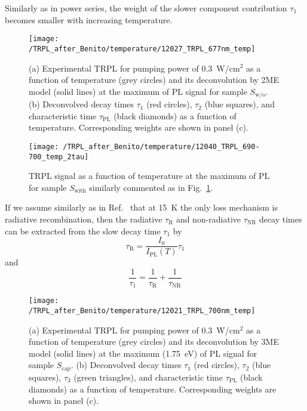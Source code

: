 {{Similarly as in power series, the weight of the slower component contribution $\tau_1$ becomes smaller with increasing temperature.
%
\begin{figure}
	\centering
	\texttt{[image: /TRPL\_after\_Benito/temperature/12027\_TRPL\_677nm\_temp]}
	\caption{(a) Experimental TRPL for pumping power of 0.3~W/cm$^2$ as a function of temperature (grey circles) and its deconvolution by 2ME model (solid lines) at the maximum of PL signal for sample $S_\mathrm{w/o}$. (b) Deconvolved decay times $\tau_1$ (red circles), $\tau_2$ (blue squares), and characteristic time $\tau_\mathrm{PL}$ (black diamonds) as a function of temperature. Corresponding weights are shown in panel (c).}
	\label{fig:TRPL_temp_wo}
\end{figure}
%
\begin{figure}
	\centering
	\texttt{[image: /TRPL\_after\_Benito/temperature/12040\_TRPL\_690-700\_temp\_2tau]}
	\caption{TRPL signal as a function of temperature at the maximum of PL for sample $S_\mathrm{with}$ similarly commented as in Fig.~\ref{fig:TRPL_temp_wo}.}
	\label{fig:TRPL_temp_w}
\end{figure}
%

If we assume similarly as in Ref.~\citep{t_alvarez} that at 15~K the only loss mechanism is radiative recombination, then the radiative $\tau_\mathrm{R}$ and non-radiative $\tau_\mathrm{NR}$ decay times can be extracted from the slow decay time $\tau_1$ by
%
\begin{equation}
\tau_\mathrm{R}=\frac{I_0}{I_\mathrm{PL}(T)}\tau_1 \label{eq:tau_R_fromtau1}
\end{equation}
and
\begin{equation}
\frac{1}{\tau_1}=\frac{1}{\tau_\mathrm{R}} + \frac{1}{\tau_\mathrm{NR}}
\end{equation}
%
\begin{figure}
	\centering
	\texttt{[image: /TRPL\_after\_Benito/temperature/12021\_TRPL\_700nm\_temp]}
	\caption{(a) Experimental TRPL for pumping power of 0.3~W/cm$^2$ as a function of temperature (grey circles) and its deconvolution by 3ME model (solid lines) at the maximum (1.75~eV) of PL signal for sample $S_\mathrm{cap}$. (b) Deconvolved decay times $\tau_1$ (red circles), $\tau_2$ (blue squares),  $\tau_3$ (green triangles), and characteristic time $\tau_\mathrm{PL}$ (black diamonds) as a function of temperature. Corresponding weights are shown in panel (c).}
	\label{fig:TRPL_temp_c}
\end{figure}
%

}}
